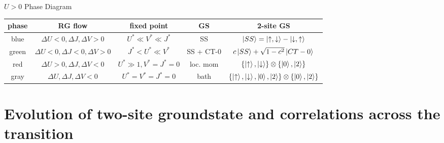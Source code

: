 \documentclass[aspectratio=169]{beamer}
\begin{document}
\begin{frame}[noframenumbering]{\(U > 0\) Phase Diagram}
\begin{center}
\hspace*{-20pt}
{\small
\begin{tabular}{|c|c|c|c|c|}
\hline
phase & RG flow & fixed point & GS & 2-site GS \\ 
\hline
blue & \(\Delta U <0, \Delta J,\Delta V>0\) & \(U^* \ll V^* \ll J^*\) & SS & \(\ket{SS}=\ket{\uparrow,\downarrow} - \ket{\downarrow, \uparrow}\)  \\ 
green &  \(\Delta U < 0, \Delta J < 0,\Delta V>0\) & \(J^* < U^* \ll V^*\) & SS + CT-0 & \(c\ket{SS} + \sqrt{1-c^2}\ket{CT-0}\)  \\  
red &  \(\Delta U > 0, \Delta J,\Delta V<0\) & \(U^* \gg 1,  V^* = J^* = 0\) & loc. mom & \(\left\{\ket{\uparrow}, \ket{\downarrow} \right\} \otimes \left\{\ket{0}, \ket{2}\right\} \) \\
gray &  \(\Delta U, \Delta J,\Delta V < 0\) & \(U^* = V^* = J^* = 0\) & bath & \(\left\{\ket{\uparrow}, \ket{\downarrow}, \ket{0}, \ket{2} \right\} \otimes \left\{\ket{0}, \ket{2}\right\}\) \\
\hline
\end{tabular}
}
\end{center}
\end{frame}

\section{Evolution of two-site groundstate and correlations across the transition}
\end{document}
